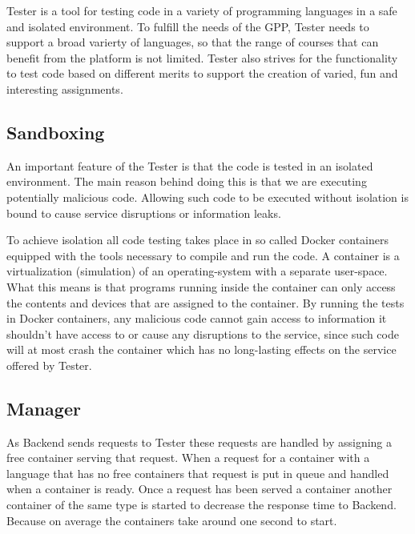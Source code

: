 Tester is a tool for testing code in a variety of programming languages in a safe and isolated environment. To fulfill the needs of the GPP, Tester needs to support a  broad varierty of languages, so that the range of courses that can benefit from the platform is not limited. Tester also strives for the functionality to test code based on different merits to support the creation of varied, fun and interesting assignments.

\subsection{Sandboxing}
An important feature of the Tester is that the code is tested in an isolated environment. The main reason behind doing this is that we are executing potentially malicious code. Allowing such code to be executed without isolation is bound to cause service disruptions or information leaks.

To achieve isolation all code testing takes place in so called Docker containers equipped with the tools necessary to compile and run the code. A container is a virtualization (simulation) of an operating-system with a separate user-space. What this means is that programs running inside the container can only access the contents and devices that are assigned to the container. By running the tests in Docker containers, any malicious code cannot gain access to information it shouldn't have access to or cause any disruptions to the service, since such code will at most crash the container which has no long-lasting effects on the service offered by Tester.
\subsection{Manager}

As Backend sends requests to Tester these requests are handled by assigning a free container serving that request.
When a request for a container with a language that has no free containers that
request is put in queue and handled when a container is ready. Once a request has
been served a container another container of the same type is started to decrease
the response time to Backend. Because on average the containers
take around one second to start.

